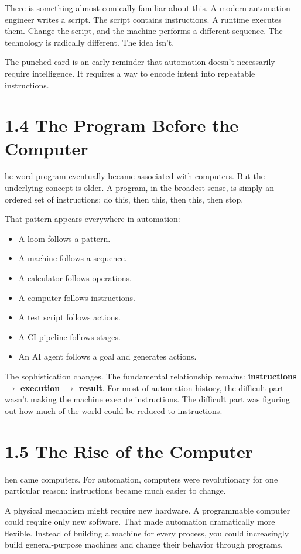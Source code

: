 \documentclass[11pt, a4paper, openany]{book}
\newcommand{\initialcap}[1]{{\fontfamily{lmss}\selectfont\huge\textbf{#1}}}
\begin{document}
There is something almost comically familiar about this. A modern automation engineer writes a script. The script contains instructions. A runtime executes them. Change the script, and the machine performs a different sequence. The technology is radically different. The idea isn't.

The punched card is an early reminder that automation doesn't necessarily require intelligence. It requires a way to encode intent into repeatable instructions.

\section{1.4 The Program Before the Computer}
\noindent \initialcap{T}he word program eventually became associated with computers. But the underlying concept is older. A program, in the broadest sense, is simply an ordered set of instructions: do this, then this, then this, then stop.

That pattern appears everywhere in automation:
\begin{itemize}
    \item A loom follows a pattern.
    \item A machine follows a sequence.
    \item A calculator follows operations.
    \item A computer follows instructions.
    \item A test script follows actions.
    \item A CI pipeline follows stages.
    \item An AI agent follows a goal and generates actions.
\end{itemize}

The sophistication changes. The fundamental relationship remains: \textbf{instructions $\rightarrow$ execution $\rightarrow$ result}. For most of automation history, the difficult part wasn't making the machine execute instructions. The difficult part was figuring out how much of the world could be reduced to instructions.

\section{1.5 The Rise of the Computer}
\noindent \initialcap{T}hen came computers. For automation, computers were revolutionary for one particular reason: instructions became much easier to change.

A physical mechanism might require new hardware. A programmable computer could require only new software. That made automation dramatically more flexible. Instead of building a machine for every process, you could increasingly build general-purpose machines and change their behavior through programs.
\end{document}
